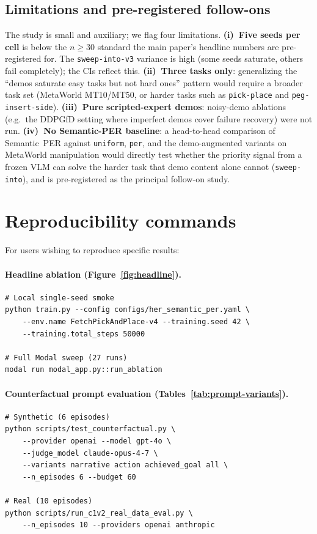 \subsection{Limitations and pre-registered follow-ons}
\label{app:mw:limitations}

The study is small and auxiliary; we flag four limitations.
\textbf{(i)~Five seeds per cell} is below the $n\!\ge\!30$ standard
the main paper's headline numbers are pre-registered for. The
\texttt{sweep-into-v3} variance is high (some seeds saturate, others
fail completely); the CIs reflect this.
\textbf{(ii)~Three tasks only}: generalizing the
``demos saturate easy tasks but not hard ones'' pattern would
require a broader task set (MetaWorld MT10/MT50, or harder tasks
such as \texttt{pick-place} and \texttt{peg-insert-side}).
\textbf{(iii)~Pure scripted-expert demos}: noisy-demo ablations
(e.g.\ the DDPGfD setting where imperfect demos cover failure
recovery) were not run.
\textbf{(iv)~No Semantic-PER baseline}: a head-to-head comparison of
Semantic~PER against \texttt{uniform}, \texttt{per}, and the
demo-augmented variants on MetaWorld manipulation would directly
test whether the priority signal from a frozen VLM can solve the
harder task that demo content alone cannot (\texttt{sweep-into}),
and is pre-registered as the principal follow-on study.

\section{Reproducibility commands}
\label{app:commands}

For users wishing to reproduce specific results:

\paragraph{Headline ablation (Figure~\ref{fig:headline}).}
{\small
\begin{verbatim}
# Local single-seed smoke
python train.py --config configs/her_semantic_per.yaml \
    --env.name FetchPickAndPlace-v4 --training.seed 42 \
    --training.total_steps 50000

# Full Modal sweep (27 runs)
modal run modal_app.py::run_ablation
\end{verbatim}}

\paragraph{Counterfactual prompt evaluation
(Tables~\ref{tab:prompt-variants}).}
{\small
\begin{verbatim}
# Synthetic (6 episodes)
python scripts/test_counterfactual.py \
    --provider openai --model gpt-4o \
    --judge_model claude-opus-4-7 \
    --variants narrative action achieved_goal all \
    --n_episodes 6 --budget 60

# Real (10 episodes)
python scripts/run_c1v2_real_data_eval.py \
    --n_episodes 10 --providers openai anthropic
\end{verbatim}}

